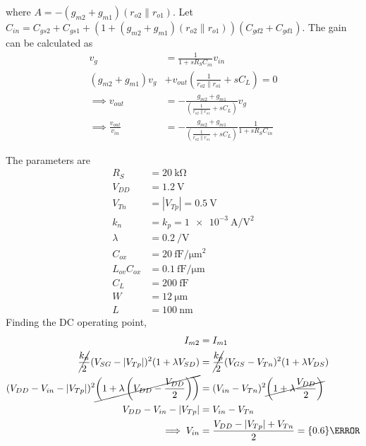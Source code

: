 \documentclass{article}
\begin{document}
\begin{subparts}
  where \(A = -(g_{m2} + g_{m1}) (r_{o2} \parallel r_{o1})\).
  Let \(C_{in} = C_{gs2} + C_{gs1} + (1 + (g_{m2} + g_{m1}) (r_{o2} \parallel r_{o1})) (C_{gd2} + C_{gd1})\).
  The gain can be calculated as
  \begin{align}
    v_{g} &= \frac{1}{1 + s R_{S} C_{in}} v_{in} \\
    (g_{m2} + g_{m1}) v_{g} &+ v_{out} \left(\frac{1}{r_{o2} \parallel r_{o1}} + s C_{L}\right) = 0 \\
    \implies v_{out} &= -\frac{g_{m2} + g_{m1}}{\left(\frac{1}{r_{o2} \parallel r_{o1}} + s C_{L}\right)} v_{g} \\
    \implies \frac{v_{out}}{v_{in}} &= -\frac{g_{m2} + g_{m1}}{\left(\frac{1}{r_{o2} \parallel r_{o1}} + s C_{L}\right)} \frac{1}{1 + s R_{S} C_{in}}
  \end{align}
  \item The parameters are
  \begin{align}
    R_{S} &= \qty{20}{\kilo\ohm} \\
    V_{DD} &= \qty{1.2}{\volt} \\
    V_{Tn} &= |V_{Tp}| = \qty{0.5}{\volt} \\
    k_{n} &= k_{p} = \qty{1e-3}{\ampere\per\volt\squared} \\
    \lambda &= \qty{0.2}{\per\volt} \\
    C_{ox} &= \qty{20}{\femto\farad\per\micro\meter\squared} \\
    L_{ov} C_{ox} &= \qty{0.1}{\femto\farad\per\micro\meter} \\
    C_{L} &= \qty{200}{\femto\farad} \\
    W &= \qty{12}{\micro\meter} \\
    L &= \qty{100}{\nano\meter}
  \end{align}
  Finding the DC operating point,
  \begin{align}
    I_{m2} &= I_{m1} \\
    \cancel{\frac{k_{n}}{2}} (V_{SG} - |V_{Tp}|)^{2} (1 + \lambda V_{SD}) &= \cancel{\frac{k_{p}}{2}} (V_{GS} - V_{Tn})^{2} (1 + \lambda V_{DS}) \\
    (V_{DD} - V_{in} - |V_{Tp}|)^{2} \cancel{\left(1 + \lambda \left(V_{DD} - \frac{V_{DD}}{2}\right)\right)} &= (V_{in} - V_{Tn})^{2} \cancel{\left(1 + \lambda \frac{V_{DD}}{2}\right)} \\
    V_{DD} - V_{in} - |V_{Tp}| &= V_{in} - V_{Tn} \\
    \implies V_{in} &= \frac{V_{DD} - |V_{Tp}| + V_{Tn}}{2} = \qty{0.6}{\volt}
  \end{align}

\end{subparts}
\end{document}
